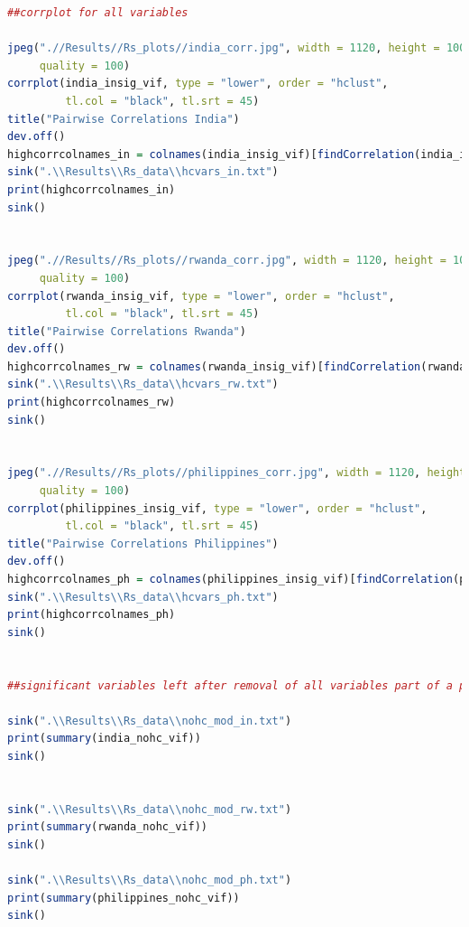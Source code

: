 \documentclass[11pt]{article}
\begin{document}
\begin{lstlisting}[language= R]
##corrplot for all variables

jpeg(".//Results//Rs_plots//india_corr.jpg", width = 1120, height = 1000, units = "px", pointsize = 20,
     quality = 100)
corrplot(india_insig_vif, type = "lower", order = "hclust", 
         tl.col = "black", tl.srt = 45)
title("Pairwise Correlations India")
dev.off()
highcorrcolnames_in = colnames(india_insig_vif)[findCorrelation(india_insig_vif, cutoff = 0.70)]
sink(".\\Results\\Rs_data\\hcvars_in.txt")
print(highcorrcolnames_in)
sink() 


jpeg(".//Results//Rs_plots//rwanda_corr.jpg", width = 1120, height = 1000, units = "px", pointsize = 20,
     quality = 100)
corrplot(rwanda_insig_vif, type = "lower", order = "hclust", 
         tl.col = "black", tl.srt = 45)
title("Pairwise Correlations Rwanda")
dev.off()
highcorrcolnames_rw = colnames(rwanda_insig_vif)[findCorrelation(rwanda_insig_vif, cutoff = 0.70)]
sink(".\\Results\\Rs_data\\hcvars_rw.txt")
print(highcorrcolnames_rw)
sink() 


jpeg(".//Results//Rs_plots//philippines_corr.jpg", width = 1120, height = 1000, units = "px", pointsize = 20,
     quality = 100)
corrplot(philippines_insig_vif, type = "lower", order = "hclust", 
         tl.col = "black", tl.srt = 45)
title("Pairwise Correlations Philippines")
dev.off()
highcorrcolnames_ph = colnames(philippines_insig_vif)[findCorrelation(philippines_insig_vif, cutoff = 0.70)]
sink(".\\Results\\Rs_data\\hcvars_ph.txt")
print(highcorrcolnames_ph)
sink() 


##significant variables left after removal of all variables part of a pair with correlation >0.7

sink(".\\Results\\Rs_data\\nohc_mod_in.txt")
print(summary(india_nohc_vif))
sink() 


sink(".\\Results\\Rs_data\\nohc_mod_rw.txt")
print(summary(rwanda_nohc_vif))
sink() 

sink(".\\Results\\Rs_data\\nohc_mod_ph.txt")
print(summary(philippines_nohc_vif))
sink() 



\end{lstlisting}
\end{document}

